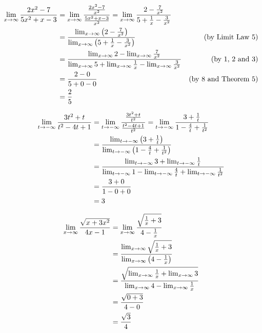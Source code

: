 \documentclass{../../../classes/anal}
\begin{document}

    \begin{equation*}
        \begin{aligned}
            \lim_{x\to\infty} {2x^2 -7 \over 5x^2 + x - 3}
            &= \lim_{x\to\infty} {{2x^2 -7 \over x^2} \over {5x^2 + x - 3 \over x^2}}
            = \lim_{x\to\infty} {2 - {7 \over x^2} \over 5 + {1 \over x} - {3 \over x^2}} \\
            &= {\lim_{x\to\infty} \left(2 - {7 \over x^2}\right) \over \lim_{x\to\infty} \left(5 + {1 \over x} - {3 \over x^2}\right)} & \text{(by Limit Law 5)}\\
            &= {\lim_{x\to\infty} 2 - \lim_{x\to\infty}{7 \over x^2} \over \lim_{x\to\infty} 5 + \lim_{x\to\infty} {1 \over x} - \lim_{x\to\infty}{3 \over x^2}} &\text{(by 1, 2 and 3)} \\
            &= {2 - 0 \over 5 + 0 - 0} & \text{(by 8 and Theorem 5)} \\
            &= {2 \over 5}
        \end{aligned}
    \end{equation*}


    \begin{equation*}
        \begin{aligned}
            \lim_{t\to-\infty} {3t^2 + t \over t^2 - 4t + 1}
            &= \lim_{t\to-\infty} {{3t^2 + t \over t^2} \over {t^2 - 4t + 1 \over t^2}}
            = \lim_{t\to-\infty} {3 + {1 \over t} \over 1 - {4 \over t} + {1 \over t^2}} \\
            &= {\lim_{t\to-\infty}\left(3 + {1 \over t}\right) \over \lim_{t\to-\infty}\left(1 - {4 \over t} + {1 \over t^2}\right)} \\
            &= {\lim_{t\to-\infty}3 + \lim_{t\to-\infty}{1 \over t} \over \lim_{t\to-\infty}1 - \lim_{t\to-\infty}{4 \over t} + \lim_{t\to-\infty}{1 \over t^2}} \\
            &= {3 + 0 \over 1 - 0 + 0} \\
            &= 3
        \end{aligned}
    \end{equation*}


    \begin{equation*}
        \begin{aligned}
            \lim_{x\to\infty} {\sqrt{x + 3x^2} \over 4x - 1}
            &= \lim_{x\to\infty} {\sqrt{{1 \over x} + 3} \over 4 - {1 \over x}} \\
            &= {\lim_{x\to\infty} \sqrt{{1 \over x} + 3} \over \lim_{x\to\infty} \left(4 - {1 \over x}\right)} \\
            &= {\sqrt{\lim_{x\to\infty}{1 \over x} + \lim_{x\to\infty}3} \over \lim_{x\to\infty}4 - \lim_{x\to\infty}{1 \over x}} \\
            &= {\sqrt{0 + 3} \over 4 - 0} \\
            &= {\sqrt{3} \over 4} \\
        \end{aligned}
    \end{equation*}
\end{document}
